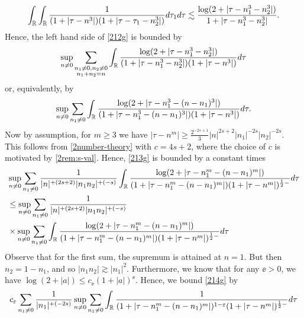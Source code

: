 %
%
\begin{equation*}
	\begin{split}
	\int_{\mathbb{R}}
		\int_{\mathbb{R}}  \frac{1}{(1 + | \tau - n^{3} |)(1 + | \tau - \tau_1 -
		n_2^3 |)} d \tau_1 d \tau \lesssim \frac{\log(2 + | \tau - n_{1}^{3} -
		n_{2}^{3} |)}{1 + | \tau - n_{1}^{3} - n_{2}^{3} |}.
	\end{split}
\end{equation*}
%
%
%
Hence, the left hand side of \eqref{212g} is bounded by
%
\begin{equation*}
	\begin{split}
		\sup_{n \neq 0} \sum_{\substack{n_1 \neq 0, n_2 \neq 0 \\n_1 +n_2 =n}}
		\int_{\mathbb{R}} \frac{\log(2 + | \tau - n_{1}^{3} -
		n_{2}^{3} |)}{(1 + | \tau - n_{1}^{3} - n_{2}^{3} |)(1 + | \tau - n^{3} |)}
		d \tau	
	\end{split}
\end{equation*}
%
%
or, equivalently, by
%
%
\begin{equation}
	\label{213g}
	\begin{split}
		\sup_{n \neq 0} \sum_{n_1 \neq 0} \int_{\mathbb{R}} \frac{\log(2 + | \tau -
		n_{1}^{3} - (n - n_1)^{3} |)}{(1 + | \tau - n_{1}^{3} - (n - n_{1})^{3} |)(1
		+ | \tau - n^{3} |)} d \tau.
	\end{split}
\end{equation}
%
%
Now by assumption, for $m \ge 3$
we have  $ |\tau - n^m| \ge
\frac{2^{-2s+1}}{3} | n |^{2s+2} | n_{1} |^{-2s}| n_2
|^{-2s}$. This follows from  \eqref{2number-theory}
with $c = 4s+2$, where the choice of $c$ is motivated by \cref{2rem:s-val}. Hence, \eqref{213g} is bounded by a constant times
%
%
%
%
\begin{equation}
	\label{214g}
	\begin{split}
		& \sup_{n \neq 0} \sum_{n_1 \neq 0}
		\frac{1}{|n|^{+(2s +2)}{|n_1 n_2 |^{+(-s)}}}\int_{\mathbb{R}} \frac{\log(2 + | \tau
		- n_{1}^m - (n - n_1)^m |)}{(1 + | \tau - n_{1}^m - (n - n_{1})^m
		|)(1 + | \tau - n^m |)^{\frac{1}{2}-}}
		d \tau
		\\
		& \le \sup_{n \neq 0} \sum_{n_1 \neq 0}
		\frac{1}{|n|^{+(2s +2)}{|n_1 n_2 |^{+(-s)}}}		\\
		& \times \sup_{n \neq 0} \sum_{n_1 \neq 0}
		\int_{\mathbb{R}} \frac{\log(2 + | \tau
		- n_{1}^m - (n - n_1)^m |)}{(1 + | \tau - n_{1}^m - (n - n_{1})^m
		|)(1 + | \tau - n^m |)^{\frac{1}{2}-}}
		d \tau
	\end{split}
\end{equation}
%
%
Observe that for the first sum, the supremum is attained at $n=1$. But then $n_2
= 1 - n_1$, and so $| n_1 n_2 | \gtrsim | n_1 |^2$. Furthermore, we know that 
for any $\ee > 0$, we have $\log (2 + | a |) \le c_{\ee}(1 + | a
|)^{\ee}$. Hence, we bound \eqref{214g} by
%
%
%
%
\begin{equation*}
	\begin{split}
		c_{\varepsilon}  \sum_{n_1 \neq 0} \frac{1}{|n_1|^{+(-2s)}}
		\sup_{n \neq 0} \sum_{n_1 \neq 0} \int_{\mathbb{R}} \frac{1}{(1 +
		| \tau - n_{1}^m - (n - n_{1})^m |)^{1- \varepsilon}(1 + | \tau - n^m
		|)^{\frac{1}{2}-}} d \tau
	\end{split}
\end{equation*}

